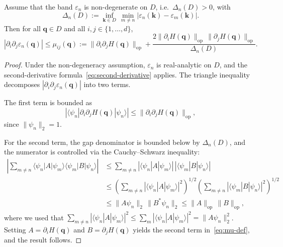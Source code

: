 \documentclass[11pt]{article}
\numberwithin{equation}{section}
\begin{document}
\begin{lemma}\label{lemma:second-deriv}
    Assume that the band \(\varepsilon_n\) is non-degenerate on \(D\), i.e.\
    \(\Delta_n(D) > 0\), with
    \begin{equation}
        \Delta_n(D) := \inf_{\mathbf{k} \in D}\,\min_{m \neq n}
        |\varepsilon_n(\mathbf{k}) - \varepsilon_m(\mathbf{k})|.
    \end{equation}
    Then for all \(\mathbf{q} \in D\) and all \(i, j \in \{1, \dots, d\}\),
    \begin{equation}
        |\partial_i \partial_j \varepsilon_n(\mathbf{q})|
        \leq \mu_{ij}(\mathbf{q})
        := \|\partial_i \partial_j H(\mathbf{q})\|_\mathrm{op}
        + \frac{2 \|\partial_i H(\mathbf{q})\|_\mathrm{op}\,
            \|\partial_j H(\mathbf{q})\|_\mathrm{op}}
        {\Delta_n(D)}.
        \label{eq:mu-def}
    \end{equation}
\end{lemma}

\begin{proof}
    Under the non-degeneracy assumption, \(\varepsilon_n\) is real-analytic
    on \(D\), and the second-derivative formula~\eqref{eq:second-derivative}
    applies. The triangle inequality decomposes \(|\partial_i \partial_j
    \varepsilon_n(\mathbf{q})|\) into two terms.

    The first term is bounded as
    \begin{equation}
        |\langle \psi_n | \partial_i \partial_j H(\mathbf{q}) | \psi_n \rangle|
        \leq \|\partial_i \partial_j H(\mathbf{q})\|_\mathrm{op},
    \end{equation}
    since \(\|\psi_n\|_2 = 1\).

    For the second term, the gap denominator is bounded below by
    \(\Delta_n(D)\), and the numerator is controlled via the
    Cauchy–Schwarz inequality:
    \begin{align}
        \left| \sum_{m \neq n}
        \langle \psi_n | A | \psi_m \rangle \langle \psi_m | B | \psi_n \rangle
        \right|
         & \leq \sum_{m \neq n}
        |\langle \psi_n | A | \psi_m \rangle|\,|\langle \psi_m | B | \psi_n \rangle| \\
         & \leq \left(\sum_{m \neq n}
                |\langle \psi_n | A | \psi_m \rangle|^2\right)^{1/2}
        \left(\sum_{m \neq n}
        |\langle \psi_m | B | \psi_n \rangle|^2\right)^{1/2}                         \\
         & \leq \|A \psi_n\|_2\,\|B^* \psi_n\|_2
        \leq \|A\|_\mathrm{op}\,\|B\|_\mathrm{op},
    \end{align}
    where we used that \(\sum_{m \neq n} |\langle \psi_n | A | \psi_m \rangle|^2
    \leq \sum_m |\langle \psi_n | A | \psi_m \rangle|^2 = \|A\psi_n\|_2^2\).
    Setting \(A = \partial_i H(\mathbf{q})\) and
    \(B = \partial_j H(\mathbf{q})\) yields the second term in~\eqref{eq:mu-def}, and the result follows.
\end{proof}
\end{document}
